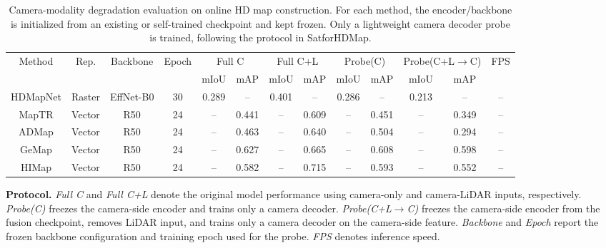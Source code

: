 
\begin{table}[t]
\centering
\caption{
Camera-modality degradation evaluation on online HD map construction.
For each method, the encoder/backbone is initialized from an existing or self-trained checkpoint and kept frozen.
Only a lightweight camera decoder probe is trained, following the protocol in SatforHDMap.
}
\label{tab:camera_degradation_probe}
\scriptsize
\setlength{\tabcolsep}{3.2pt}
\begin{tabular}{c c c c cc cc cc cc c}
\toprule
\multirow{2}{*}{Method} &
\multirow{2}{*}{Rep.} &
\multirow{2}{*}{Backbone} &
\multirow{2}{*}{Epoch} &
\multicolumn{2}{c}{Full C} &
\multicolumn{2}{c}{Full C+L} &
\multicolumn{2}{c}{Probe(C)} &
\multicolumn{2}{c}{Probe(C+L$\rightarrow$C)} &
\multirow{2}{*}{FPS} \\
\cmidrule(lr){5-6}
\cmidrule(lr){7-8}
\cmidrule(lr){9-10}
\cmidrule(lr){11-12}
& & & &
mIoU & mAP &
mIoU & mAP &
mIoU & mAP &
mIoU & mAP &
\\
\midrule

HDMapNet     & Raster & EffNet-B0 & 30 & 0.289 & -- & 0.401 & -- & 0.286 & -- & 0.213 & -- & -- \\
MapTR        & Vector & R50       & 24 & --    & 0.441 & -- & 0.609 & -- & 0.451 & -- & 0.349 & -- \\
ADMap        & Vector & R50       & 24 & --    & 0.463 & -- & 0.640 & -- & 0.504 & -- & 0.294 & -- \\
GeMap        & Vector & R50       & 24 & --    & 0.627 & -- & 0.665 & -- & 0.608 & -- & 0.598 & -- \\
HIMap        & Vector & R50       & 24 & --    & 0.582 & -- & 0.715 & -- & 0.593 & -- & 0.552 & -- \\

\bottomrule
\end{tabular}

\vspace{0.5em}
\begin{flushleft}
\footnotesize
\textbf{Protocol.}
\textit{Full C} and \textit{Full C+L} denote the original model performance using camera-only and camera-LiDAR inputs, respectively.
\textit{Probe(C)} freezes the camera-side encoder and trains only a camera decoder.
\textit{Probe(C+L$\rightarrow$C)} freezes the camera-side encoder from the fusion checkpoint, removes LiDAR input, and trains only a camera decoder on the camera-side feature.
\textit{Backbone} and \textit{Epoch} report the frozen backbone configuration and training epoch used for the probe.
\textit{FPS} denotes inference speed.
\end{flushleft}
\end{table}

